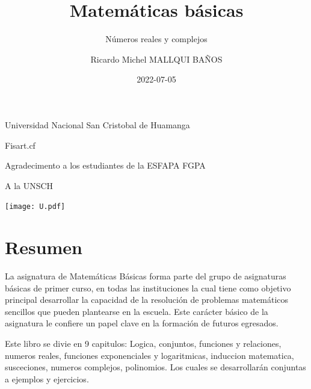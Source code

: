\documentclass[
  16pt,
]{krantz}
\title{Matemáticas básicas}
\subtitle{Números reales y complejos}
\author{Ricardo Michel MALLQUI BAÑOS}
\date{2022-07-05}
\theoremstyle{definition}
\theoremstyle{definition}
\theoremstyle{definition}
\theoremstyle{definition}
\theoremstyle{remark}
\begin{document}
\maketitle

\thispagestyle{empty}
\begin{flushright}
Universidad Nacional San Cristobal de Huamanga

Fisart.cf

Agradecimento a los estudiantes de la ESFAPA FGPA

A la UNSCH

\texttt{[image: U.pdf]}
\end{flushright}

{
\hypersetup{linkcolor=}
\setcounter{tocdepth}{2}
\tableofcontents
}
\listoftables
\listoffigures
\newcommand{\N}{\mathbb{N}}
\newcommand{\R}{\mathbb{R}}
\newcommand{\CC}{\mathbb{C}}
\newcommand{\I}{\mathbb{I}}
\newcommand{\f}{\mathbb{f}}
\newcommand{\X}{\mathbb{X}}
\newcommand{\D}{\mathbb{D}}
\newcommand{\Z}{\mathbb{Z}}
\newcommand{\Q}{\mathbb{Q}}
\newcommand{\norm}[1]{\left\Vert#1\right\Vert}
\newcommand{\abs}[1]{\left\vert#1\right\vert}
\newcommand{\set}[1]{\left\{#1\right\}}
\newcommand{\seq}[1]{\left<#1\right>}
\newcommand{\co}[1]{\left[#1\right]}
\newcommand{\cc}[1]{\left(#1\right)}
\newcommand{\J}{\mathcal{J}}
\newcommand{\K}{\mathcal{K}}
\newcommand{\M}{\mathcal{M}}
\newcommand{\F}{\mathcal{F}}

\hypertarget{resumen}{%
\chapter*{Resumen}\label{resumen}}


La asignatura de Matemáticas Básicas forma parte del grupo de asignaturas básicas de primer curso, en todas las instituciones la cual tiene como objetivo principal desarrollar la capacidad de la resolución de problemas matemáticos sencillos que pueden plantearse en la escuela. Este carácter básico de la asignatura le confiere un papel clave en la formación de futuros egresados.

Este libro se divie en 9 capitulos: Logica, conjuntos, funciones y relaciones, numeros reales, funciones exponenciales y logaritmicas, induccion matematica, susceciones, numeros complejos, polinomios. Los cuales se desarrollarán conjuntas a ejemplos y ejercicios.
\end{document}
